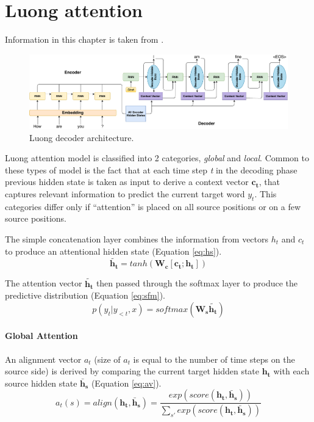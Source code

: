 
\chapter{Luong attention}
\label{luong}
Information in this chapter is taken from \cite{luong2015effective}.
\begin{figure}[hbt]
  \centering
  \includegraphics[width=1\textwidth]{figures/luong_decoder.pdf}
  \caption{Luong decoder architecture.}
  \label{luong}
\end{figure}

Luong attention model is classified into 2 categories, \textit{global} and \textit{local}. Common to these types of model is the fact that at each time step \textit{t} in the decoding phase previous hidden state is taken as input to derive a context vector $\mathbf{c_t}$, that captures relevant information to predict the current target word $y_t$. This categories differ only if ``attention'' is placed on all source positions or on a few source positions.

The simple concatenation layer combines the information from vectors $h_t$ and $c_t$ to produce an attentional hidden state (Equation \ref{eq:hs}).
\begin{equation} \label{eq:hs}
\mathbf{\widetilde{h_t}} = tanh(\mathbf{W_c}[\mathbf{c_t};\mathbf{h_t}])
\end{equation}

The attention vector $\mathbf{\widetilde{h_t}}$ then passed through the softmax layer to produce the predictive distribution (Equation \ref{eq:sfm}).
\begin{equation} \label{eq:sfm}
p(y_t|y_{<t},x) = softmax(\mathbf{W_s}\mathbf{\widetilde{h_t}})
\end{equation}

\subsubsection{Global Attention}
An alignment vector $a_t$ (size of $a_t$ is equal to the number of time steps on the source side) is derived by comparing the current target hidden state $\mathbf{h_t}$ with each source hidden state $\mathbf{\bar{h}_s}$ (Equation \ref{eq:av}).
\begin{equation} \label{eq:av}
a_t(s) = align(\mathbf{h_t}, \mathbf{\bar{h}_s}) = \frac{exp(score(\mathbf{h_t}, \mathbf{\bar{h}_s}))}{\sum_{s'} exp(score(\mathbf{h_t}, \mathbf{\bar{h}_s}))}
\end{equation}


